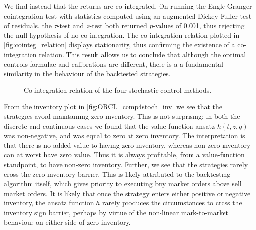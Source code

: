 We find instead that the returns are co-integrated. On running the Engle-Granger cointegration test with statistics computed using an augmented Dickey-Fuller test of residuals, the $\tau$-test and $z$-test both returned $p$-values of 0.001, thus rejecting the null hypothesis of no co-integration. The co-integration relation plotted in \autoref{fig:cointeg_relation} displays stationarity, thus confirming the existence of a co-integration relation. This result allows us to conclude that although the optimal controls formulae and calibrations are different, there is a a fundamental similarity in the behaviour of the backtested strategies.

\begin{figure}[H]
  \centering
  \setlength{} 
  \setlength{}
  
  \caption[Co-integration relation of the four stochastic control methods]{Co-integration relation of the four stochastic control methods.}
  \label{fig:cointeg_relation}
\end{figure}
From the inventory plot in \autoref{fig:ORCL_comp4stoch_inv} we see that the strategies avoid maintaining zero inventory. This is not surprising: in both the discrete and continuous cases we found that the value function ansatz $h(t,z,q)$ was non-negative, and was equal to zero at zero inventory. The interpretation is that there is no added value to having zero inventory, whereas non-zero inventory can at worst have zero value. Thus it is always profitable, from a value-function standpoint, to have non-zero inventory. Further, we see that the strategies rarely cross the zero-inventory barrier. This is likely attributed to the backtesting algorithm itself, which gives priority to executing buy market orders above sell market orders. It is likely that once the strategy enters either positive or negative inventory, the ansatz function $h$ rarely produces the circumstances to cross the inventory sign barrier, perhaps by virtue of the non-linear mark-to-market behaviour on either side of zero inventory.

